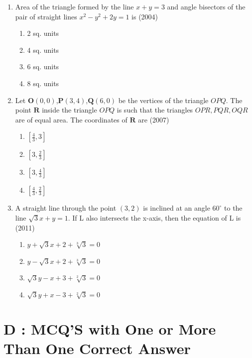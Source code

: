 \documentclass[12pt]{article}
\providecommand{\sbrak}[1]{\ensuremath{{}\left[#1\right]}}
\let\vec\mathbf
\begin{document}
\begin{enumerate}
\item Area of the triangle formed by the line $x+y=3$ and angle bisectors of the pair of straight lines $x^2-y^2+2y=1$ is (2004)
\begin{enumerate}
\item 2 sq. units  
\item 4 sq. units 
\item 6 sq. units    
\item 8 sq. units
\end{enumerate}
\item Let $\vec{O}(0,0)$,$\vec{P}(3,4)$,$\vec{Q}(6,0)$ be the vertices of the triangle $OPQ$. The point $\vec{R}$ inside the triangle $OPQ$ is such that the triangles $OPR,PQR,OQR$ are of equal area. The coordinates of $\vec{R}$ are   (2007)
\begin{enumerate}
\item $\sbrak{\frac{4}{3}, 3}$   
\item $\sbrak{3,\frac{2}{3}}$  
\item $\sbrak{3,\frac{4}{3}}$  
\item $\sbrak{\frac{4}{3},\frac{2}{3}}$
\end{enumerate}
\item A straight line through the point $(3,2)$ is inclined at an angle $60^\circ$  to the line $\sqrt{3}x+y=1$. If L also intersects the x-axis, then the equation of L is   (2011)
\begin{enumerate}
\item $y+\sqrt{3}x+2+\sqrt[3]{3}=0$
\item $y-\sqrt{3}x+2+\sqrt[3]{3}=0$ 
\item $\sqrt{3}y-x+3+\sqrt[2]{3}=0$  
\item $\sqrt{3}y+x-3+\sqrt[2]{3}=0$
\end{enumerate}
\iffalse
\end{enumerate}
\section*{D  :  MCQ'S with One or More Than One Correct Answer}
\end{document}
